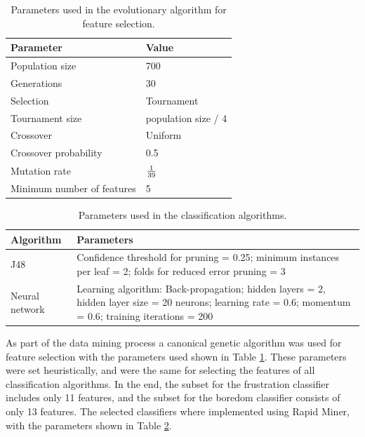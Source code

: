 \documentclass[a4paper,twoside]{article}
\begin{document}
\begin{table}[h!tb]
\centering
\caption{Parameters used in the evolutionary algorithm for feature
  selection.}
\label{tab_ga}
    \begin{tabular}{ | l | l | }
      \hline
      Parameter & Value \\
      \hline
      Population size & 700 \\
      Generations & 30 \\
      Selection & Tournament \\
      Tournament size & population size / 4 \\
      Crossover & Uniform \\
      Crossover probability & 0.5 \\
      Mutation rate & $1 \over 39$ \\
      Minimum number of features & 5 \\
            \hline

    \end{tabular}
  \end{table}
  \begin{table}[h!tb]
\centering
\caption{Parameters used in the classification algorithms.}
\label{tab_clas}
\begin{tabular}{ | l | p{10cm} | }
  \hline
  Algorithm & Parameters \\
  \hline
  J48 & Confidence threshold for pruning = 0.25; minimum instances per
        leaf = 2; folds for reduced error pruning = 3 \\
  Neural network & Learning algorithm: Back-propagation; hidden layers
                   = 2, hidden layer size = 20 neurons; learning rate
                   = 0.6; momentum = 0.6; training iterations = 200 \\
  \hline
\end{tabular}
\end{table}
%
As part of the data mining process a canonical genetic algorithm was used for feature
selection with the parameters used shown in Table \ref{tab_ga}. These
parameters were set heuristically, and were the same for selecting the
features of all classification algorithms. %
In the end, the subset for the frustration classifier includes only 11 features, and 
the subset for the boredom classifier consists of only 13 features. 
%
%
The selected classifiers where implemented using Rapid Miner, with the
  parameters shown in Table \ref{tab_clas}. 
\end{document}
